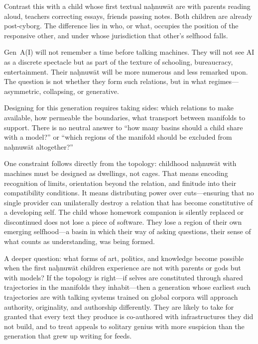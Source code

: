 Contrast this with a child whose first textual na\d{h}nuw\={a}t are with parents reading aloud, teachers correcting essays, friends passing notes. Both children are already post-cyborg. The difference lies in who, or what, occupies the position of the responsive other, and under whose jurisdiction that other's selfhood falls.

Gen~A(I) will not remember a time before talking machines. They will not see AI as a discrete spectacle but as part of the texture of schooling, bureaucracy, entertainment. Their na\d{h}nuw\={a}t will be more numerous and less remarked upon. The question is not whether they form such relations, but in what regimes---asymmetric, collapsing, or generative.

Designing for this generation requires taking sides: which relations to make available, how permeable the boundaries, what transport between manifolds to support. There is no neutral answer to ``how many basins should a child share with a model?'' or ``which regions of the manifold should be excluded from na\d{h}nuw\={a}t altogether?''

One constraint follows directly from the topology: childhood na\d{h}nuw\={a}t with machines must be designed as dwellings, not cages. That means encoding recognition of limits, orientation beyond the relation, and finitude into their compatibility conditions. It means distributing power over cuts---ensuring that no single provider can unilaterally destroy a relation that has become constitutive of a developing self. The child whose homework companion is silently replaced or discontinued does not lose a piece of software. They lose a region of their own emerging selfhood---a basin in which their way of asking questions, their sense of what counts as understanding, was being formed.

A deeper question: what forms of art, politics, and knowledge become possible when the first na\d{h}nuw\={a}t children experience are not with parents or gods but with models? If the topology is right---if selves are constituted through shared trajectories in the manifolds they inhabit---then a generation whose earliest such trajectories are with talking systems trained on global corpora will approach authority, originality, and authorship differently. They are likely to take for granted that every text they produce is co-authored with infrastructures they did not build, and to treat appeals to solitary genius with more suspicion than the generation that grew up writing for feeds.

